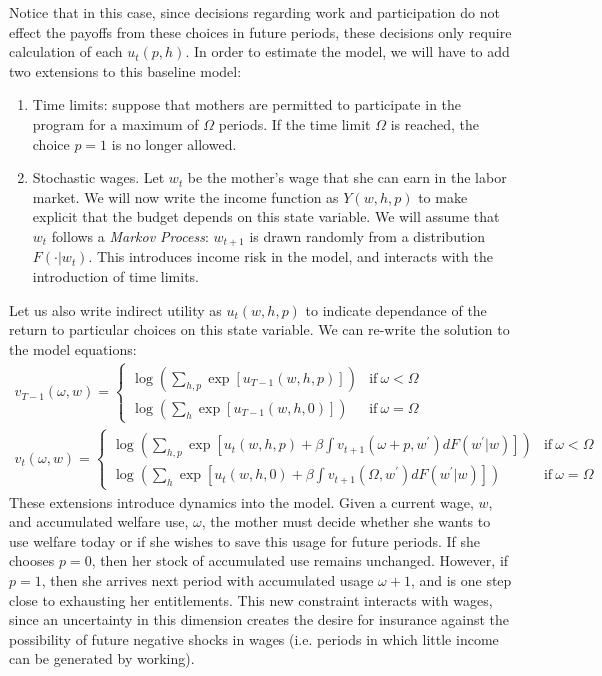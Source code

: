 \documentclass[12pt]{article}
\numberwithin{equation}{section}
\numberwithin{figure}{section}
\numberwithin{table}{section}
\begin{document}
Notice that in this case, since decisions regarding work and participation do not effect the payoffs from these choices in future periods, these decisions only require calculation of each $u_t(p,h)$. In order to estimate the model, we will have to add two extensions to this baseline model:
\begin{enumerate}
\item Time limits: suppose that mothers are permitted to participate in the program for a maximum of $\Omega$ periods. If the time limit $\Omega$ is reached, the choice $p=1$ is no longer allowed.
\item Stochastic wages. Let $w_t$ be the mother's wage that she can earn in the labor market. We will now write the income function as $Y(w,h,p)$ to make explicit that the budget depends on this state variable. We will assume that $w_t$ follows a \emph{Markov Process}: $w_{t+1}$ is drawn randomly from a distribution $F(\cdot|w_t)$. This introduces income risk in the model, and interacts with the introduction of time limits.
\end{enumerate}
Let us also write indirect utility as $u_t(w,h,p)$ to indicate dependance of the return to particular choices on this state variable. We can re-write the solution to the model equations:
\begin{eqnarray}
v_{T-1}(\omega,w) = \left\{\begin{array}{ll}\log\left(\sum_{h,p}\exp[u_{T-1}(w,h,p)]\right) & \text{if}\ \omega<\Omega  \\
\log\left(\sum_{h}\exp[u_{T-1}(w,h,0)]\right) & \text{if}\ \omega=\Omega\end{array}\right. \nonumber \\
v_t(\omega,w) = \left\{\begin{array}{ll}\log\left(\sum_{h,p}\exp[u_{t}(w,h,p) + \beta\int v_{t+1}(\omega+p,w^\prime)dF(w^\prime|w)]\right) & \text{if}\ \omega<\Omega \\
\log\left(\sum_{h}\exp[u_{t}(w,h,0) + \beta\int v_{t+1}(\Omega,w^\prime)dF(w^\prime|w)]\right) & \text{if}\ \omega=\Omega\end{array}\right.\nonumber
\end{eqnarray}
These extensions introduce dynamics into the model. Given a current wage, $w$, and accumulated welfare use, $\omega$, the mother must decide whether she wants to use welfare today or if she wishes to save this usage for future periods. If she chooses $p=0$, then her stock of accumulated use remains unchanged. However, if $p=1$, then she arrives next period with accumulated usage $\omega+1$, and is one step close to exhausting her entitlements. This new constraint interacts with wages, since an uncertainty in this dimension creates the desire for insurance against the possibility of future negative shocks in wages (i.e. periods in which little income can be generated by working).
\end{document}
